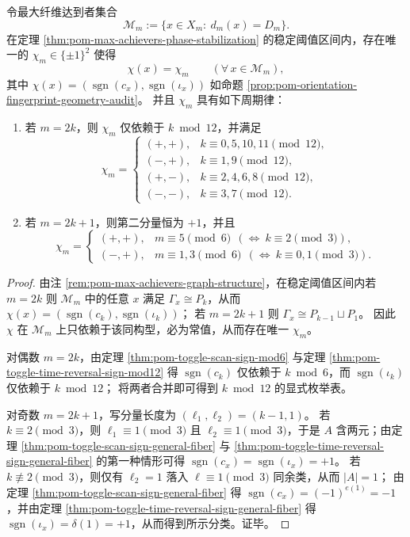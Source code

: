 \begin{theorem}[最大纤维族的取向指纹刚性与显式周期分类]\label{thm:pom-maxfiber-orientation-charge-periodic}
令最大纤维达到者集合
\[
\mathcal{M}_m:=\{x\in X_m:\ d_m(x)=D_m\}.
\]
在定理 \ref{thm:pom-max-achievers-phase-stabilization} 的稳定阈值区间内，存在唯一的 \(\chi_m\in\{\pm1\}^2\) 使得
\[
\chi(x)=\chi_m\qquad(\forall\,x\in \mathcal{M}_m),
\]
其中 \(\chi(x)=(\operatorname{sgn}(c_x),\operatorname{sgn}(\iota_x))\) 如命题 \ref{prop:pom-orientation-fingerprint-geometry-audit}。
并且 \(\chi_m\) 具有如下周期律：
\begin{enumerate}
\normalfont
  \item 若 \(m=2k\)，则 \(\chi_m\) 仅依赖于 \(k\bmod 12\)，并满足
  \[
  \chi_m=
  \begin{cases}
  (+,+), & k\equiv 0,5,10,11\pmod{12},\\
  (-,+), & k\equiv 1,9\pmod{12},\\
  (+,-), & k\equiv 2,4,6,8\pmod{12},\\
  (-,-), & k\equiv 3,7\pmod{12}.
  \end{cases}
  \]
  \item 若 \(m=2k+1\)，则第二分量恒为 \(+1\)，并且
  \[
  \chi_m=
  \begin{cases}
  (+,+), & m\equiv 5\pmod{6}\ \ (\Leftrightarrow\ k\equiv 2\pmod3),\\
  (-,+), & m\equiv 1,3\pmod{6}\ \ (\Leftrightarrow\ k\equiv 0,1\pmod3).
  \end{cases}
  \]
\end{enumerate}
\end{theorem}
\begin{proof}
由注 \ref{rem:pom-max-achievers-graph-structure}，在稳定阈值区间内若 \(m=2k\) 则
\(\mathcal{M}_m\) 中的任意 \(x\) 满足 \(\Gamma_x\cong P_k\)，从而 \(\chi(x)=(\operatorname{sgn}(c_k),\operatorname{sgn}(\iota_k))\)；
若 \(m=2k+1\) 则 \(\Gamma_x\cong P_{k-1}\sqcup P_1\)。
因此 \(\chi\) 在 \(\mathcal{M}_m\) 上只依赖于该同构型，必为常值，从而存在唯一 \(\chi_m\)。
\par
对偶数 \(m=2k\)，由定理 \ref{thm:pom-toggle-scan-sign-mod6} 与定理 \ref{thm:pom-toggle-time-reversal-sign-mod12} 得
\(\operatorname{sgn}(c_k)\) 仅依赖于 \(k\bmod 6\)，而 \(\operatorname{sgn}(\iota_k)\) 仅依赖于 \(k\bmod 12\)；
将两者合并即可得到 \(k\bmod 12\) 的显式枚举表。
\par
对奇数 \(m=2k+1\)，写分量长度为 \((\ell_1,\ell_2)=(k-1,1)\)。
若 \(k\equiv 2\pmod3\)，则 \(\ell_1\equiv 1\pmod3\) 且 \(\ell_2\equiv 1\pmod3\)，于是 \(A\) 含两元；由定理 \ref{thm:pom-toggle-scan-sign-general-fiber} 与 \ref{thm:pom-toggle-time-reversal-sign-general-fiber} 的第一种情形可得
\(\operatorname{sgn}(c_x)=\operatorname{sgn}(\iota_x)=+1\)。
若 \(k\not\equiv 2\pmod3\)，则仅有 \(\ell_2=1\) 落入 \(\ell\equiv 1\pmod3\) 同余类，从而 \(|A|=1\)；
由定理 \ref{thm:pom-toggle-scan-sign-general-fiber} 得 \(\operatorname{sgn}(c_x)=(-1)^{e(1)}=-1\)，并由定理 \ref{thm:pom-toggle-time-reversal-sign-general-fiber} 得 \(\operatorname{sgn}(\iota_x)=\delta(1)=+1\)，从而得到所示分类。证毕。
\end{proof}

